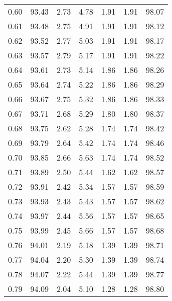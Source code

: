 \begin{tabular}{|c|c|c|c|c|c|c|}
      0.60 &     93.43 &      2.73 &       4.78 &    1.91 &       1.91 &         98.07 \\
      0.61 &     93.48 &      2.75 &       4.91 &    1.91 &       1.91 &         98.12 \\
      0.62 &     93.52 &      2.77 &       5.03 &    1.91 &       1.91 &         98.17 \\
      0.63 &     93.57 &      2.79 &       5.17 &    1.91 &       1.91 &         98.22 \\
      0.64 &     93.61 &      2.73 &       5.14 &    1.86 &       1.86 &         98.26 \\
      0.65 &     93.64 &      2.74 &       5.22 &    1.86 &       1.86 &         98.29 \\
      0.66 &     93.67 &      2.75 &       5.32 &    1.86 &       1.86 &         98.33 \\
      0.67 &     93.71 &      2.68 &       5.29 &    1.80 &       1.80 &         98.37 \\
      0.68 &     93.75 &      2.62 &       5.28 &    1.74 &       1.74 &         98.42 \\
      0.69 &     93.79 &      2.64 &       5.42 &    1.74 &       1.74 &         98.46 \\
      0.70 &     93.85 &      2.66 &       5.63 &    1.74 &       1.74 &         98.52 \\
      0.71 &     93.89 &      2.50 &       5.44 &    1.62 &       1.62 &         98.57 \\
      0.72 &     93.91 &      2.42 &       5.34 &    1.57 &       1.57 &         98.59 \\
      0.73 &     93.93 &      2.43 &       5.43 &    1.57 &       1.57 &         98.62 \\
      0.74 &     93.97 &      2.44 &       5.56 &    1.57 &       1.57 &         98.65 \\
      0.75 &     93.99 &      2.45 &       5.66 &    1.57 &       1.57 &         98.68 \\
      0.76 &     94.01 &      2.19 &       5.18 &    1.39 &       1.39 &         98.71 \\
      0.77 &     94.04 &      2.20 &       5.30 &    1.39 &       1.39 &         98.74 \\
      0.78 &     94.07 &      2.22 &       5.44 &    1.39 &       1.39 &         98.77 \\
      0.79 &     94.09 &      2.04 &       5.10 &    1.28 &       1.28 &         98.80 \\

\end{tabular}
